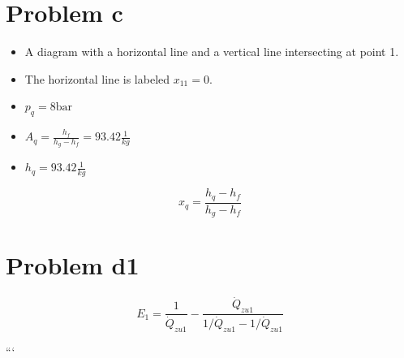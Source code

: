 \section*{Problem c}
\begin{itemize}
    \item A diagram with a horizontal line and a vertical line intersecting at point 1.
    \item The horizontal line is labeled \( x_{11} = 0 \).
    \item \( p_{q} = 8 \text{bar} \)
    \item \( A_q = \frac{h_f}{h_g - h_f} = 93.42 \frac{1}{kg} \)
    \item \( h_q = 93.42 \frac{1}{kg} \)
\end{itemize}

\[
x_q = \frac{h_q - h_f}{h_g - h_f}
\]

\section*{Problem d1}
\[
E_1 = \frac{1}{\dot{Q}_{zu1}} - \frac{\dot{Q}_{zu1}}{1/\dot{Q}_{zu1} - 1/\dot{Q}_{zu1}}
\]

```